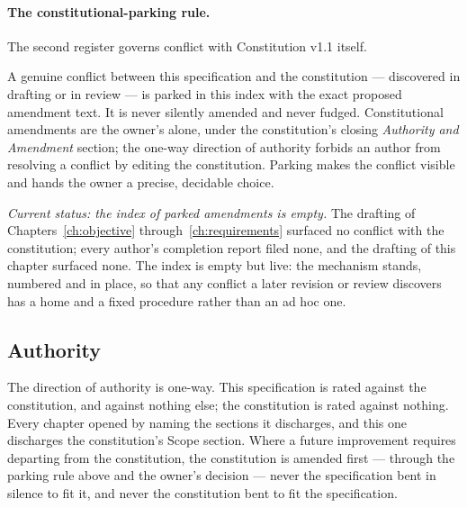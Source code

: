 \paragraph{The constitutional-parking rule.} The second register governs conflict with
Constitution v1.1 itself.

\begin{principle}
A genuine conflict between this specification and the constitution --- discovered in
drafting or in review --- is parked in this index with the exact proposed amendment text.
It is never silently amended and never fudged. Constitutional amendments are the owner's
alone, under the constitution's closing \emph{Authority and Amendment} section; the
one-way direction of authority forbids an author from resolving a conflict by editing the
constitution. Parking makes the conflict visible and hands the owner a precise, decidable
choice.
\end{principle}

\emph{Current status: the index of parked amendments is empty.} The drafting of
Chapters~\ref{ch:objective} through~\ref{ch:requirements} surfaced no conflict with the
constitution; every author's completion report filed none, and the drafting of this
chapter surfaced none. The index is empty but live: the mechanism stands, numbered and
in place, so that any conflict a later revision or review discovers has a home and a fixed
procedure rather than an ad hoc one.

\subsection{Authority}

The direction of authority is one-way. This specification is rated against the
constitution, and against nothing else; the constitution is rated against nothing. Every
chapter opened by naming the sections it discharges, and this one discharges the
constitution's Scope section. Where a future improvement requires departing from the
constitution, the constitution is amended first --- through the parking rule above and the
owner's decision --- never the specification bent in silence to fit it, and never the
constitution bent to fit the specification.
